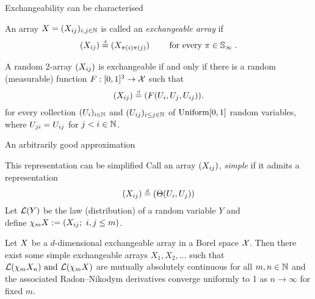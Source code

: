 \begin{frame}{Exchangeability can be characterised}
\begin{block}{}
  \begin{definition*}
  An array $X=(X_{ij})_{i,j\in\mathbb{N}}$ is called an \emph{exchangeable array} if 
  \begin{equation*}
    \label{eq:jointly:ex}
    (X_{ij})\stackrel{\mbox{\tiny d}}{=}(X_{\pi(i)\pi(j)}) \qquad\text{ for every }\pi\in\mathbb{S}_{\infty}\;.
  \end{equation*}
\end{definition*}
\end{block}

\begin{block}{}
\begin{theorem*}
  \label{theorem:ah}
  A random 2-array $(X_{ij})$ is exchangeable if and only if there is a random (measurable) function ${F:[0,1]^3\rightarrow\mathcal{X}}$ such that 
  \begin{equation*}
    \label{eq:ah}
    (X_{ij})\stackrel{\mbox{\tiny d}}{=} (F(U_i,U_j,U_{ij})).
  \end{equation*}
for every collection  $(U_i)_{i\in\mathbb{N}}$ and $(U_{ij})_{i\le j\in\mathbb{N}}$ of \iid $\mbox{\rm Uniform}[0,1]$ random variables, where $U_{ji} = U_{ij}$ for $j < i \in \mathbb{N}$.
\end{theorem*}
\end{block}
\end{frame}

\begin{frame}{An arbitrarily good approximation}
  \begin{block}{This representation can be simplified}
Call an array $(X_{ij})$, \emph{simple} if it admits a representation
\[
(X_{ij}) \overset{\,_{\!d}}{=} (\Theta(U_{i},U_{j})) \nonumber
\]
Let $\mathcal{L}(Y)$ be the law (distribution) of a random variable $Y$ and \\define $\chi_m X := (X_{ij}; \ i,j \le m )$.
\end{block}
\begin{block}{}
\begin{thm}[{Kallenberg}]
\label{theorem:simple}
Let $X$ be a $d$-dimensional exchangeable array in a Borel space $\mathcal{X}$.  Then there exist some simple exchangeable arrays $X_1,X_2,\dotsc$ such that $\mathcal{L}(\chi_m X_n) \textrm{ and } \mathcal{L}(\chi_m X)$ are mutually absolutely continuous for all $m,n \in \mathbb{N}$ and the associated Radon--Nikodym derivatives converge uniformly to 1 as $n \to \infty$ for fixed $m$.
\end{thm}
  \end{block}
\end{frame}

